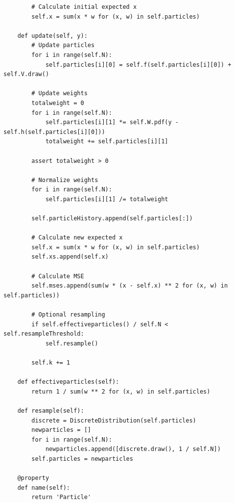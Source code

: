 \documentclass[paper=a4, fontsize=11pt]{scrartcl} %
\numberwithin{equation}{section} %
\numberwithin{figure}{section} %
\numberwithin{table}{section} %
\begin{document}
\begin{lstlisting}
        # Calculate initial expected x
        self.x = sum(x * w for (x, w) in self.particles)

    def update(self, y):
        # Update particles
        for i in range(self.N):
            self.particles[i][0] = self.f(self.particles[i][0]) + self.V.draw()

        # Update weights
        totalweight = 0
        for i in range(self.N):
            self.particles[i][1] *= self.W.pdf(y - self.h(self.particles[i][0]))
            totalweight += self.particles[i][1]

        assert totalweight > 0

        # Normalize weights
        for i in range(self.N):
            self.particles[i][1] /= totalweight

        self.particleHistory.append(self.particles[:])

        # Calculate new expected x
        self.x = sum(x * w for (x, w) in self.particles)
        self.xs.append(self.x)

        # Calculate MSE
        self.mses.append(sum(w * (x - self.x) ** 2 for (x, w) in self.particles))

        # Optional resampling
        if self.effectiveparticles() / self.N < self.resampleThreshold:
            self.resample()

        self.k += 1

    def effectiveparticles(self):
        return 1 / sum(w ** 2 for (x, w) in self.particles)

    def resample(self):
        discrete = DiscreteDistribution(self.particles)
        newparticles = []
        for i in range(self.N):
            newparticles.append([discrete.draw(), 1 / self.N])
        self.particles = newparticles

    @property
    def name(self):
        return 'Particle'
\end{lstlisting}
\end{document}
